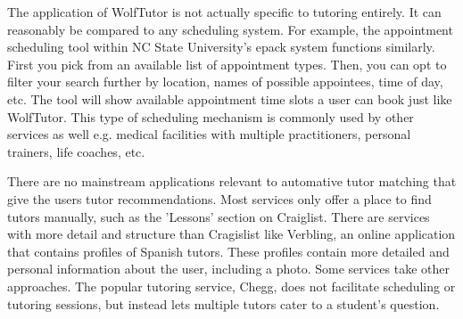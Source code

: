 The application of WolfTutor is not actually specific to tutoring entirely.
It can reasonably be compared to any scheduling system.
For example, the appointment scheduling tool within NC State University's epack system functions similarly.
First you pick from an available list of appointment types. Then, you can opt to filter your search further by location, names of possible appointees, time of day, etc.
The tool will show available appointment time slots a user can book just like WolfTutor.
This type of scheduling mechanism is commonly used by other services as well e.g. medical facilities with multiple practitioners, personal trainers, life coaches, etc.

There are no mainstream applications relevant to automative tutor matching that give the users tutor recommendations. 
Most services only offer a place to find tutors manually, such as the 'Lessons' section on Craiglist. \cite{RefWorks:doc:5abd46a5e4b0770b05a4080c} 
There are services with more detail and structure than Cragislist like Verbling, an online application that contains profiles of Spanish tutors. 
These profiles contain more detailed and personal information about the user, including a photo. \cite{RefWorks:doc:5abd466ce4b0689719ee9277} 
Some services take other approaches. 
The popular tutoring service, Chegg, does not facilitate scheduling or tutoring sessions, but instead lets multiple tutors cater to a student's question. \cite{RefWorks:doc:5abd45f7e4b0770b05a407c4}



